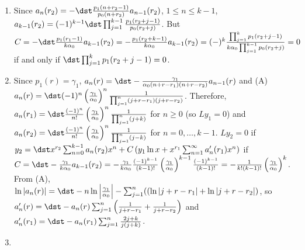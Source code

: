 \documentclass[openany]{book}
\newenvironment{sectionSolutions}{
 \begin{enumerate}[item-label={\thesection.\arabic{enumi}.}]
}{
 \end{enumerate}
}
\begin{document}
\begin{sectionSolutions}
\item
Since
$a_n(r_2)=-\dst\frac{p_1(n+r_2-1)}{ p_0(n+r_2)}a_{n-1}(r_2)$,
$1\le n\le k-1$, $a_{k-1}(r_2)=(-1)^{k-1}\dst\prod_{j=1}^{k-1}
\frac{p_1(r_2+j-1)}{ p_0(r_2+j)}$. But $C=-\dst\frac{p_1(r_1-1)}{
k\alpha_0}a_{k-1}(r_2)=-\frac{p_1(r_2+k-1)}{ k\alpha_0}a_{k-1}(r_2)
=(-)^k\frac{\prod_{j=1}^kp_1(r_2+j-1)}{ k\alpha_0\prod_{j=1}^{k-1}
p_0(r_2+j)}=0$ if and only if $\dst\prod_{j=1}^kp_1(r_2+j-1)=0$.



\item Since $p_1(r)=\gamma_1$,
$a_n(r)=\dst-\frac{\gamma_1}{\alpha_0(n+r-r_1)(n+r-r_2)}a_{n-1}(r)$ and
(A) $a_n(r)=\dst(-1)^n\left(\frac{\gamma_1}{\alpha_0}\right)^n
\frac{1}{\prod_{j=1}^n(j+r-r_1)(j+r-r_2)}$. Therefore,
$a_n(r_1)=\dst\frac{(-1)^n}{ n!}\left(\frac{\gamma_1}{\alpha_0}\right)^n
\frac{1}{\prod_{j=1}^n(j+k)}$ for $n\ge0$ (so $Ly_1=0$) and
$a_n(r_2)=\dst\frac{(-1)^n}{ n!}\left(\frac{\gamma_1}{\alpha_0}\right)^n
\frac{1}{\prod_{j=1}^n(j-k)}$ for $n=0,\dots,k-1$. $Ly_2=0$ if $y_2=\dst
x^{r_2}\sum_{n=0}^{k-1} a_n(r_2)x^n+C\left(y_1\ln x+
x^{r_1}\sum_{n=1}^\infty a_n'(r_1)x^n\right)$ if
$C=\dst-\frac{\gamma_1}{ k\alpha_0}a_{k-1}(r_2)=-\frac{\gamma_1}{
k\alpha_0}\frac{(-1)^{k-1}}{(k-1)!}
\left(\frac{\gamma_1}{\alpha_0}\right)^{k-1}\frac{(-1)^{k-1}}{(k-1)!}
=-\frac{1}{ k!(k-1)!} \left(\frac{\gamma_1}{\alpha_0}\right)^k$. From (A),
$\ln|a_n(r)|=\dst-n\ln\left|\frac{\gamma_1}{\alpha_0}\right|
-\sum_{j=1}^n(\left(\ln|j+r-r_1|+\ln|j+r-r_2|\right)$, so
$a_n'(r)=\dst-a_n(r)\sum_{j=1}^n\left(\frac{1}{ j+r-r_1}+ \frac{1}{
j+r-r_2}\right)$ and $a_n'(r_1)=\dst-a_n(r_1)\sum_{j=1}^n \frac{2j+k}{
j(j+k)}$.



\item
{}
\end{sectionSolutions}
\end{document}

